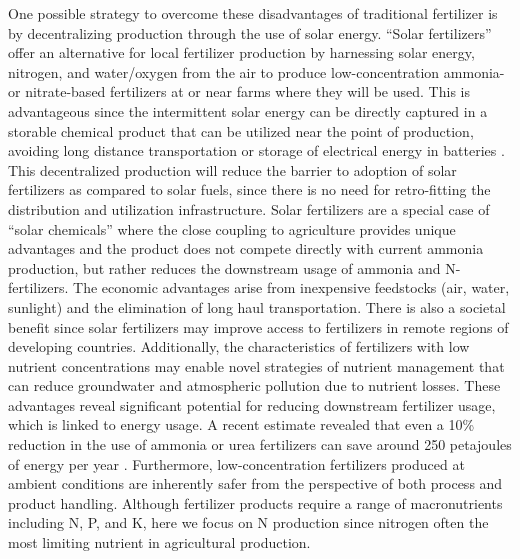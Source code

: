 One possible strategy to overcome these disadvantages of traditional fertilizer is by decentralizing production through the use of solar energy. ``Solar fertilizers'' offer an alternative for local fertilizer production by harnessing solar energy, nitrogen, and water/oxygen from the air to produce low-concentration ammonia- or nitrate-based fertilizers at or near farms where they will be used. This is advantageous since the intermittent solar energy can be directly captured in a storable chemical product that can be utilized near the point of production, avoiding long distance transportation or storage of electrical energy in batteries \cite{MacKay_2013}. This decentralized production will reduce the barrier to adoption of solar fertilizers as compared to solar fuels, since there is no need for retro-fitting the distribution and utilization infrastructure. Solar fertilizers are a special case of ``solar chemicals'' where the close coupling to agriculture provides unique advantages and the product does not compete directly with current ammonia production, but rather reduces the downstream usage of ammonia and N-fertilizers. The economic advantages arise from inexpensive feedstocks (air, water, sunlight) and the elimination of long haul transportation. There is also a societal benefit since solar fertilizers may improve access to fertilizers in remote regions of developing countries. Additionally, the characteristics of fertilizers with low nutrient concentrations may enable novel strategies of nutrient management that can reduce groundwater and atmospheric pollution due to nutrient losses. These advantages reveal significant potential for reducing downstream fertilizer usage, which is linked to energy usage. A recent estimate revealed that even a 10\% reduction in the use of ammonia or urea fertilizers can save around 250 petajoules of energy per year \cite{Levi_2018}. Furthermore, low-concentration fertilizers produced at ambient conditions are inherently safer from the perspective of both process and product handling. Although fertilizer products require a range of macronutrients including N, P, and K, here we focus on N production since nitrogen often the most limiting nutrient in agricultural production\cite{Yousaf2017, VanderVelde2014}.

